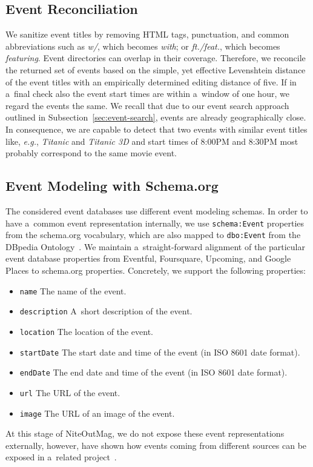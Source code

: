 \documentclass[runningheads,a4paper]{llncs}
\begin{document}
{\subsection{Event Reconciliation}
We sanitize event titles by removing HTML tags, punctuation, and
common abbreviations such as \emph{w/}, which becomes \emph{with}; or \emph{ft./feat.}, which becomes \emph{featuring}.
Event directories can overlap in their coverage.
Therefore, we reconcile the returned set of events based on the simple, yet effective Levenshtein distance of the event titles with an empirically determined editing distance of five.
If in a~final check also the event start times are within a~window of one hour,
we regard the events the same.
We recall that due to our event search approach outlined in Subsection~\ref{sec:event-search},
events are already geographically close.
In consequence, we are capable to detect that two events with similar event titles like, \emph{e.g.}, \emph{Titanic} and \emph{Titanic 3D} and start times of 8:00PM and 8:30PM most probably correspond to the same movie event.

\subsection{Event Modeling with Schema.org}
The considered event databases use different event modeling schemas.
In order to have a~common event representation internally,
we use \texttt{schema:Event} properties~\cite{schemaorgevent} from the schema.org vocabulary,
which are also mapped to \texttt{dbo:Event} from the DBpedia Ontology~\cite{dbpedia2schemaorg}.
We maintain a~straight-forward alignment of the particular event database properties
from Eventful, Foursquare, Upcoming, and Google Places to schema.org properties.
Concretely, we support the following properties:
\begin{itemize}
  \item \texttt{name} The name of the event.
  \item \texttt{description} A~short description of the event.
  \item \texttt{location} The location of the event.
  \item \texttt{startDate} The start date and time of the event (in ISO 8601 date format).
  \item \texttt{endDate} The end date and time of the event (in ISO 8601 date format).
  \item \texttt{url} The URL of the event.
  \item \texttt{image} The URL of an image of the event.
\end{itemize}
At this stage of NiteOutMag, we do not expose these event representations externally,
however, have shown how events coming from different sources
can be exposed in a~related project~\cite{Liu2011}.

}
\end{document}
